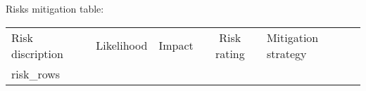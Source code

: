 Risks mitigation table:



\begin{center}
\begin{tabular}{ p{3cm} | c | c | c | p{6cm} }
    \hline
    \hline
    Risk discription & Likelihood & Impact & Risk rating & Mitigation strategy \\
    {{ risk_rows }}
    \hline
    \hline
  \end{tabular}
\end{center}